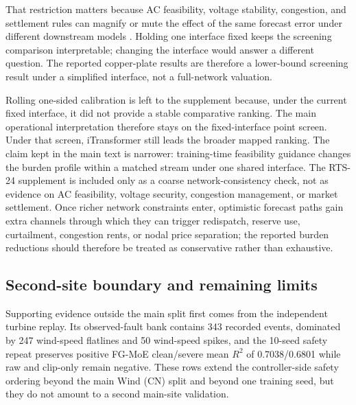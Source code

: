 \documentclass[review,1p,times]{elsarticle}
\begin{document}
That restriction matters because AC feasibility, voltage stability, congestion, and settlement rules can magnify or mute the effect of the same forecast error under different downstream models \citep{li2024opf_highren,liu2024vscopf,larrahondo2021acdcomp}. Holding one interface fixed keeps the screening comparison interpretable; changing the interface would answer a different question. The reported copper-plate results are therefore a lower-bound screening result under a simplified interface, not a full-network valuation.

Rolling one-sided calibration is left to the supplement because, under the current fixed interface, it did not provide a stable comparative ranking. The main operational interpretation therefore stays on the fixed-interface point screen. Under that screen, iTransformer still leads the broader mapped ranking. The claim kept in the main text is narrower: training-time feasibility guidance changes the burden profile within a matched stream under one shared interface. The RTS-24 supplement is included only as a coarse network-consistency check, not as evidence on AC feasibility, voltage security, congestion management, or market settlement. Once richer network constraints enter, optimistic forecast paths gain extra channels through which they can trigger redispatch, reserve use, curtailment, congestion rents, or nodal price separation; the reported burden reductions should therefore be treated as conservative rather than exhaustive.

\subsection{Second-site boundary and remaining limits}
\label{subsec:disc_reliability}
\label{subsec:disc_crossover}

Supporting evidence outside the main split first comes from the independent turbine replay. Its observed-fault bank contains 343 recorded events, dominated by 247 wind-speed flatlines and 50 wind-speed spikes, and the 10-seed safety repeat preserves positive FG-MoE clean/severe mean $R^2$ of 0.7038/0.6801 while raw and clip-only remain negative. These rows extend the controller-side safety ordering beyond the main Wind (CN) split and beyond one training seed, but they do not amount to a second main-site validation.
\end{document}
